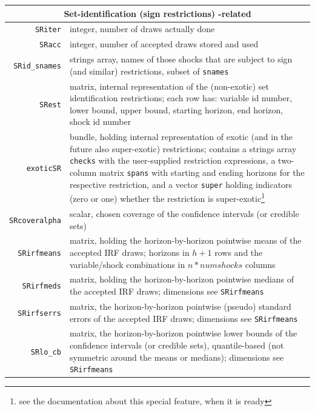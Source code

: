 \documentclass[a4paper,10pt]{article}
\begin{document}
    \begin{tabular}{rp{}}
    \hline
    \multicolumn{2}{c}{\textbf{Set-identification (sign restrictions) -related}} \\
    \hline 
    \texttt{SRiter} & integer, number of draws actually done \\
    \texttt{SRacc} & integer, number of accepted draws stored and used\\
    \texttt{SRid\_snames} & strings array, names of those shocks that are subject 
      to sign (and similar) restrictions, subset of \texttt{snames}\\
    \texttt{SRest} & matrix, internal representation of the (non-exotic) set identification
    restrictions; each row has: variable id number, lower bound, upper bound, starting
   horizon, end horizon, shock id number  \\
   \texttt{exoticSR} & bundle, holding internal representation of exotic (and in the future also 
   super-exotic) restrictions; contains a strings array \texttt{checks} with the user-supplied
   restriction expressions, a two-column matrix \texttt{spans} with starting and ending horizons
   for the respective restriction, and a vector \texttt{super} holding indicators (zero or one) 
   whether the restriction is super-exotic\footnote{see the documentation about this special feature,
   when it is ready}\\
   \texttt{SRcoveralpha} & scalar, chosen coverage of the confidence intervals (or credible sets)\\
   
   \texttt{SRirfmeans} & matrix, holding the horizon-by-horizon pointwise means of 
   the accepted IRF draws; horizons in $h+1$ rows and the variable/shock combinations
   in $n*numshocks$ columns\\
   
    \texttt{SRirfmeds} & matrix, holding the horizon-by-horizon pointwise medians of 
   the accepted IRF draws; dimensions see  \texttt{SRirfmeans}\\
   
   \texttt{SRirfserrs} & matrix, the horizon-by-horizon pointwise (pseudo) standard errors
  of the accepted IRF draws;  dimensions see \texttt{SRirfmeans}\\
  
  \texttt{SRlo\_cb} & matrix, the horizon-by-horizon pointwise lower bounds of the 
  confidence intervals (or credible sets), quantile-based (not symmetric around the 
  means or medians); dimensions see  \texttt{SRirfmeans}\\
  

\end{tabular}
\end{document}
